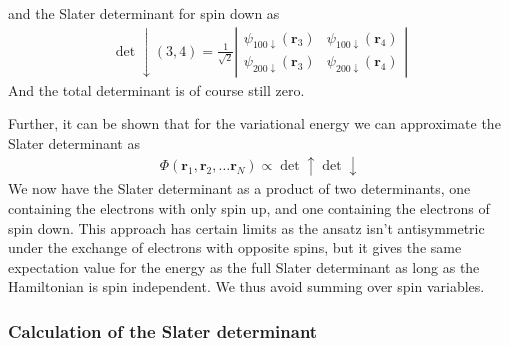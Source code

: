 \documentclass[11pt]{article}
\begin{document}
		and the Slater determinant for spin down as
		\begin{align}
			\det\downarrow(3,4)=\frac{1}{\sqrt{2}}\left|\begin{array}{cc}
			\psi_{100\downarrow}(\mathbf{r}_{3}) & \psi_{100\downarrow}(\mathbf{r}_{4})\\
			\psi_{200\downarrow}(\mathbf{r}_{3}) & \psi_{200\downarrow}(\mathbf{r}_{4})
			\end{array}\right|
		\end{align}
		And the total determinant is of course still zero.

		Further, it can be shown that for the variational energy we can approximate
		the Slater determinant as
		\begin{align}
			\Phi(\mathbf{r}_{1},\mathbf{r}_{2},\dots\mathbf{r}_{N})\propto\det\uparrow\det\downarrow
		\end{align}
		We now have the Slater determinant as a product of two determinants,
		one containing the electrons with only spin up, and one containing
		the electrons of spin down. This approach has certain limits as the
		ansatz isn't antisymmetric under the exchange of electrons with opposite
		spins, but it gives the same expectation value for the energy as the
		full Slater determinant as long as the Hamiltonian is spin independent.
		We thus avoid summing over spin variables.


	\subsubsection{Calculation of the Slater determinant}
\end{document}
